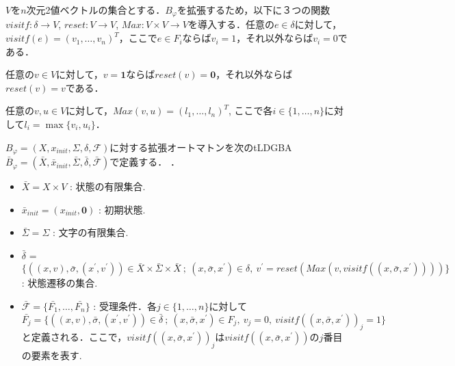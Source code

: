 \documentclass[a4j,9pt,twocolumn]{jsarticle}
\theoremstyle{definition}
\begin{document}
$V$を$n$次元2値ベクトルの集合とする．$B_{\varphi}$を拡張するため，以下に３つの関数$visitf: \delta \to V$, $reset:V \to V$, $Max:V \times V \to V$を導入する．任意の$e \in \delta$に対して，$visitf(e) = (v_1,\ldots,v_n)^T$，ここで$e\in F_i$ならば$v_i = 1$，それ以外ならば$v_i = 0$である．
\begin{comment}
\begin{align}
 v_i =
  \left\{
  \begin{aligned}
    1 &   & &\text{if}\ e\in F_i, \\
    0 &   & &\text{otherwise}.
  \end{aligned}
  \right. \nonumber
\end{align}
\end{comment}
任意の$v \in V$に対して，$v = \bm{1}$ならば$reset(v) = \bm{0}$，それ以外ならば$reset(v) = v$である．
\begin{comment}
\begin{align}
  reset(v) =
  \left\{
  \begin{aligned}
    \bm{0} &   & &\text{if}\  v = \bm{1},\\
    v &   & &\text{otherwise}.
  \end{aligned}
  \right. \nonumber
\end{align}
\end{comment}
任意の$v,u \in V$に対して，$Max(v,u) = (l_1, \ldots, l_n)^T$, ここで各$i \in \{ 1,\dots, n \}$に対して$l_i = \max \{ v_i, u_i \}$．

$B_\varphi = (X,x_{init},\Sigma,\delta,\mathcal{F})$に対する拡張オートマトンを次のtLDGBA $\bar{B}_{\varphi} = (\bar{X},\bar{x}_{init},\bar{\Sigma},\bar{\delta},\bar{\mathcal{F}})$で定義する．
．
\begin{itemize}
  \item $\bar{X} = X \times V$ : 状態の有限集合.
  \item $\bar{x}_{init} = (x_{init}, \bm{0})$ : 初期状態.
  \item $\bar{\Sigma} = \Sigma$ : 文字の有限集合.
  \item $\bar{\delta}$ = $\{ ((x,v), \bar{\sigma}, (x^{\prime},v^{\prime})) \in \bar{X} \times \bar{\Sigma} \times \bar{X}\ ;\ (x,\bar{\sigma},x^{\prime}) \in \delta,\ v^{\prime} = reset(Max(v,visitf((x,\bar{\sigma},x^{\prime})))) \}$: 状態遷移の集合.
  \item $\mathcal{\bar{F}} = \{ \bar{F_1}, \ldots ,\bar{F_n} \}$ : 受理条件．各$j \in \{ 1,\ldots,n \}$に対して$\bar{F_j} = \{ ((x,v), \bar{\sigma}, (x^{\prime},v^{\prime})) \in \bar{\delta}\ ;\ (x, \bar{\sigma}, x^{\prime}) \in F_j,\ v_j = 0,\ visitf((x, \bar{\sigma}, x^{\prime}))_j = 1\}$と定義される．ここで，$visitf((x, \bar{\sigma}, x^{\prime}))_j$は$visitf((x, \bar{\sigma}, x^{\prime}))$の$j$番目の要素を表す.
\end{itemize}
\end{document}

